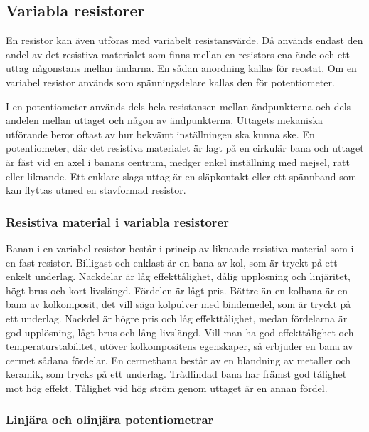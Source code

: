 \subsection{Variabla resistorer}

En resistor kan även utföras med variabelt resistansvärde. Då används endast
den andel av det resistiva materialet som finns mellan en resistors ena ände
och ett uttag någonstans mellan ändarna. En sådan anordning kallas för reostat.
Om en variabel resistor används som spänningsdelare kallas den för
potentiometer.

I en potentiometer används dels hela resistansen mellan ändpunkterna och dels
andelen mellan uttaget och någon av ändpunkterna.
Uttagets mekaniska utförande beror oftast av hur bekvämt inställningen ska
kunna ske.
En potentiometer, där det resistiva materialet är lagt på en cirkulär bana och
uttaget är fäst vid en axel i banans centrum, medger enkel inställning med
mejsel, ratt eller liknande.
Ett enklare slags uttag är en släpkontakt eller ett spännband som kan flyttas
utmed en stavformad resistor.

\subsubsection{Resistiva material i variabla resistorer}

Banan i en variabel resistor består i princip av liknande resistiva material som
i en fast resistor.
Billigast och enklast är en bana av kol, som är tryckt på ett enkelt underlag.
Nackdelar är låg effekttålighet, dålig upplösning och linjäritet, högt brus och
kort livslängd. Fördelen är lågt pris.
Bättre än en kolbana är en bana av kolkomposit, det vill säga kolpulver med
bindemedel, som är tryckt på ett underlag.
Nackdel är högre pris och låg effekttålighet, medan fördelarna är god
upplösning, lågt brus och lång livslängd.
Vill man ha god effekttålighet och temperaturstabilitet, utöver kolkompositens
egenskaper, så erbjuder en bana av cermet sådana fördelar.
En cermetbana består av en blandning av metaller och keramik, som trycks på ett
underlag.
Trådlindad bana har främst god tålighet mot hög effekt.
Tålighet vid hög ström genom uttaget är en annan fördel.

\subsubsection{Linjära och olinjära potentiometrar}

